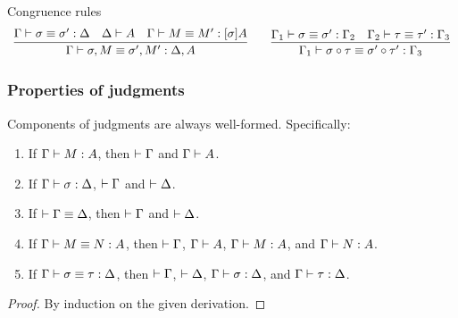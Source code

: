 \noindent
Congruence rules
\[
\begin{array}{c}
  \infer{
    \eqsub \Gamma {\subext \sigma M} {\subext {\sigma'} {M'}} {\ctxext \Delta A}
  }{
    \eqsub \Gamma \sigma {\sigma'} \Delta
    &
    \wftyp \Delta A
    &
    \eqexp \Gamma M {M'} {\tmclo \sigma A}
  }
  \qquad
  \infer{
    \eqsub {\Gamma_1} {\subclo \sigma \tau} {\subclo {\sigma'} {\tau'}} {\Gamma_3}
  }{
    \eqsub {\Gamma_1} \sigma {\sigma'} {\Gamma_2}
    &
    \eqsub {\Gamma_2} \tau {\tau'} {\Gamma_3}
  }
\end{array}
\]


\subsubsection{Properties of judgments}

\begin{lemma}[Presupposition]
  Components of judgments are always well-formed.
  Specifically:
  \begin{enumerate}
  \item If $\Gamma \vdash M : A$, then $\vdash \Gamma$ and $\Gamma \vdash A$.
  \item If $\Gamma \vdash \sigma : \Delta$, $\vdash \Gamma$ and $\vdash \Delta$.
  \item If $\vdash \Gamma \equiv \Delta$, then $\vdash \Gamma$ and $\vdash \Delta$.
  \item If $\Gamma \vdash M \equiv N : A$, then $\vdash \Gamma$, $\Gamma \vdash A$, $\Gamma \vdash M : A$, and $\Gamma \vdash N : A$.
  \item If $\Gamma \vdash \sigma \equiv \tau : \Delta$, then $\vdash \Gamma$, $\vdash \Delta$, $\Gamma \vdash \sigma : \Delta$, and $\Gamma \vdash \tau : \Delta$.
  \end{enumerate}
\end{lemma}
\begin{proof}
  By induction on the given derivation.
\end{proof}

